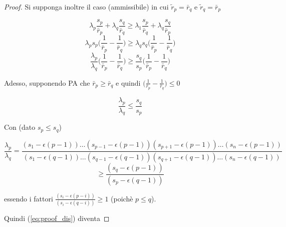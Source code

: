 \begin{proof}
    Si supponga inoltre il caso (ammissibile) in cui $\tilde{r}_p = \bar{r}_q$ e $\tilde{r}_q = \bar{r}_p$  
    
    \begin{equation*}
        \lambda_p \frac{s_p}{\bar{r}_p} + \lambda_{q} \frac{s_{q}}{\bar{r}_{q}} \geq
        \lambda_1 \frac{s_p}{\bar{r}_q} + \lambda_{q} \frac{s_{q}}{\bar{r}_{p}}
        \label{eq:}
    \end{equation*}
    \begin{equation*}
        \lambda_p s_p \bigg( \frac{1}{\bar{r}_p} - \frac{1}{\bar{r}_q}\bigg) \geq 
        \lambda_q s_q \bigg( \frac{1}{\bar{r}_p} - \frac{1}{\bar{r}_q} \bigg)
        \label{eq:proof}
    \end{equation*}
    \begin{equation*}
        \frac{\lambda_p}{\lambda_q}  \bigg( \frac{1}{\bar{r}_p} - \frac{1}{\bar{r}_q}\bigg) \geq 
        \frac{s_q}{s_p} \bigg( \frac{1}{\bar{r}_p} - \frac{1}{\bar{r}_q} \bigg)
        \label{eq:proof}
    \end{equation*}
    
    Adesso, supponendo PA che $\bar{r}_p \geq \bar{r}_q$ e quindi $\bigg( \frac{1}{\bar{r}_p} - \frac{1}{\bar{r}_q} \bigg) \leq 0$
    
    \begin{equation}
        \frac{\lambda_p}{\lambda_q} \leq 
        \frac{s_q}{s_p}
        \label{eq:proof_dis}
    \end{equation}
    
    Con (dato $s_p \leq s_q$) 
    
    \begin{equation*}
        \frac{\lambda_p}{\lambda_q} = \frac{(s_1 - \epsilon(p-1))\dots(s_{p-1} - \epsilon(p-1))(s_{p+1} - \epsilon(p-1))
        \dots(s_n - \epsilon(p-1))}
        {(s_1 - \epsilon(q-1))\dots(s_{q-1} - \epsilon(q-1))(s_{q+1} - \epsilon(q-1))\dots(s_n - \epsilon(q-1))}
        \label{eq:}
    \end{equation*}
    \begin{equation*}
        \geq \frac{(s_q - \epsilon(p-1))}
        {(s_p - \epsilon(q-1))}
        \label{eq:}
    \end{equation*}
    
    \noindent
    essendo i fattori $\frac{(s_i - \epsilon(p-i))}{(s_{i} - \epsilon(q-i))} \geq 1$ (poichè $p \leq q$).
    
    Quindi (\ref{eq:proof_dis}) diventa
    

\end{proof}
